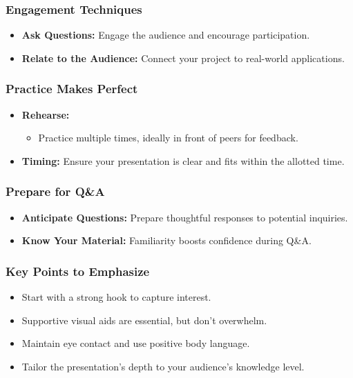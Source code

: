 \documentclass[aspectratio=169]{beamer}
\begin{document}
\begin{frame}[fragile]
    \frametitle{Engagement Techniques}
    \begin{itemize}
        \item \textbf{Ask Questions:} Engage the audience and encourage participation.
        \item \textbf{Relate to the Audience:} Connect your project to real-world applications.
    \end{itemize}
\end{frame}

\begin{frame}[fragile]
    \frametitle{Practice Makes Perfect}
    \begin{itemize}
        \item \textbf{Rehearse:} 
            \begin{itemize}
                \item Practice multiple times, ideally in front of peers for feedback.
            \end{itemize}
        \item \textbf{Timing:} Ensure your presentation is clear and fits within the allotted time.
    \end{itemize}
\end{frame}

\begin{frame}[fragile]
    \frametitle{Prepare for Q\&A}
    \begin{itemize}
        \item \textbf{Anticipate Questions:} Prepare thoughtful responses to potential inquiries.
        \item \textbf{Know Your Material:} Familiarity boosts confidence during Q\&A.
    \end{itemize}
\end{frame}

\begin{frame}[fragile]
    \frametitle{Key Points to Emphasize}
    \begin{itemize}
        \item Start with a strong hook to capture interest.
        \item Supportive visual aids are essential, but don’t overwhelm.
        \item Maintain eye contact and use positive body language.
        \item Tailor the presentation’s depth to your audience’s knowledge level.
    \end{itemize}
\end{frame}
\end{document}
